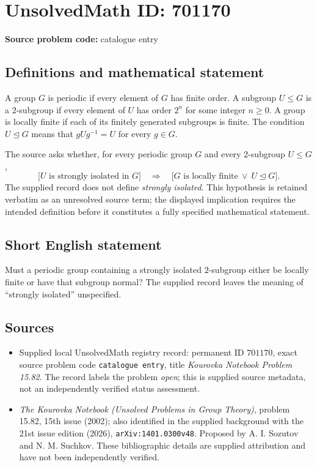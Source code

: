 \documentclass[11pt]{article}
\begin{document}
\section*{UnsolvedMath ID: 701170}
\textbf{Source problem code:} catalogue entry
\subsection{Definitions and mathematical statement}
A group $G$ is periodic if every element of $G$ has finite order. A subgroup $U\leq G$ is a $2$-subgroup if every element of $U$ has order $2^n$ for some integer $n\geq 0$. A group is locally finite if each of its finitely generated subgroups is finite. The condition $U\trianglelefteq G$ means that $gUg^{-1}=U$ for every $g\in G$.

The source asks whether, for every periodic group $G$ and every $2$-subgroup $U\leq G$,
\[
\bigl[U\text{ is strongly isolated in }G\bigr]
\quad\Longrightarrow\quad
\bigl[G\text{ is locally finite}\ \lor\ U\trianglelefteq G\bigr].
\]
The supplied record does not define \emph{strongly isolated}. This hypothesis is retained verbatim as an unresolved source term; the displayed implication requires the intended definition before it constitutes a fully specified mathematical statement.
\subsection{Short English statement}
Must a periodic group containing a strongly isolated $2$-subgroup either be locally finite or have that subgroup normal? The supplied record leaves the meaning of ``strongly isolated'' unspecified.
\subsection{Sources}
\begin{itemize}
\item Supplied local UnsolvedMath registry record: permanent ID $701170$, exact source problem code \texttt{catalogue entry}, title \emph{Kourovka Notebook Problem 15.82}. The record labels the problem \emph{open}; this is supplied source metadata, not an independently verified status assessment.
\item \emph{The Kourovka Notebook (Unsolved Problems in Group Theory)}, problem 15.82, 15th issue (2002); also identified in the supplied background with the 21st issue edition (2026), \texttt{arXiv:1401.0300v48}. Proposed by A. I. Sozutov and N. M. Suchkov. These bibliographic details are supplied attribution and have not been independently verified.
\end{itemize}
\end{document}
